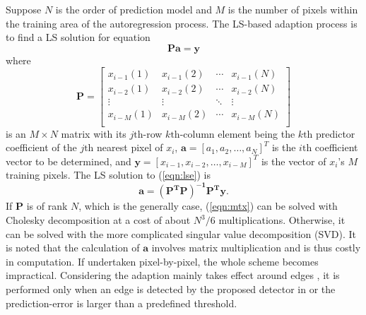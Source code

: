 \documentclass[journal]{IEEEtran}
\begin{document}
Suppose $N$ is the order of prediction model and $M$ is the number of pixels within the training
area of the autoregression process. The LS-based adaption process is to find a LS solution for
equation 
\begin{equation}\label{eqn:lse}
    \mathbf{Pa} = \mathbf{y}
\end{equation}
where 
\begin{equation}\label{eqn:lsp}
    \mathbf{P} = \left[ \begin{array}{cccc}
	x_{i-1}(1) & x_{i-1}(2) & \cdots & x_{i-1}(N) \\
	x_{i-2}(1) & x_{i-2}(2) & \cdots & x_{i-2}(N) \\
	\vdots 	& \vdots & \ddots & \vdots \\
	x_{i-M}(1) & x_{i-M}(2) & \cdots & x_{i-M}(N) \\
    \end{array} \right]
\end{equation}
is an $M \times N$ matrix with its $j\mbox{th}$-row $k\mbox{th}$-column element being the
$k\mbox{th}$ predictor coefficient of the $j\mbox{th}$ nearest pixel of $x_i$,
$\mathbf{a}=[a_1,a_2,\dots,a_N]^T$ is the $i\mbox{th}$ coefficient vector to be determined, and
$\mathbf{y}=[x_{i-1},x_{i-2},\dots,x_{i-M}]^T$ is the vector of $x_i$'s $M$ training pixels. The LS
solution to (\ref{eqn:lse}) is
\begin{equation}\label{eqn:mtx}
    \mathbf{a} = \mathbf{(P^TP)^{-1}P^Ty}.
\end{equation}
If $\mathbf{P}$ is of rank $N$, which is the generally case, (\ref{eqn:mtx}) can be solved with Cholesky
decomposition at a cost of about $N^3/6$ multiplications. Otherwise, it can be solved with the more
complicated singular value decomposition (SVD). It is noted that the calculation of $\mathbf{a}$
involves matrix multiplication and is thus costly in computation. If undertaken pixel-by-pixel, the
whole scheme becomes impractical. Considering the adaption mainly takes effect around edges
\cite{Li01edp}, it is performed only when an edge is detected by the proposed detector in
\cite{Kau05lsap} or the prediction-error is larger than a predefined threshold. 
\end{document}
